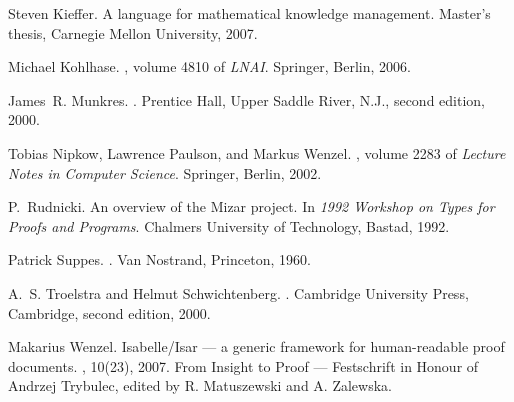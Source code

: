 \documentclass{llncs}
\begin{document}
\begin{thebibliography}{10}
Steven Kieffer.
\newblock A language for mathematical knowledge management.
\newblock Master's thesis, Carnegie Mellon University, 2007.

Michael Kohlhase.
, volume
  4810 of {\em LNAI}.
\newblock Springer, Berlin, 2006.

James~R. Munkres.
.
\newblock Prentice Hall, Upper Saddle River, N.J., second edition, 2000.

 Tobias Nipkow, Lawrence Paulson, and Markus
  Wenzel.  , volume 2283 of {\em Lecture Notes in Computer
    Science}.  \newblock Springer, Berlin, 2002.

P.~Rudnicki.
\newblock An overview of the Mizar project.
\newblock In {\em 1992 Workshop on Types for Proofs and Programs}. Chalmers
  University of Technology, Bastad, 1992.

Patrick Suppes.
.
\newblock Van Nostrand, Princeton, 1960.

A.~S. Troelstra and Helmut Schwichtenberg.
.
\newblock Cambridge University Press, Cambridge, second edition, 2000.

Makarius Wenzel.
\newblock Isabelle/Isar --- a generic framework for human-readable proof
  documents.
, 10(23), 2007.
\newblock From Insight to Proof --- Festschrift in Honour of Andrzej Trybulec,
  edited by R. Matuszewski and A. Zalewska.

\end{thebibliography}
\end{document}
